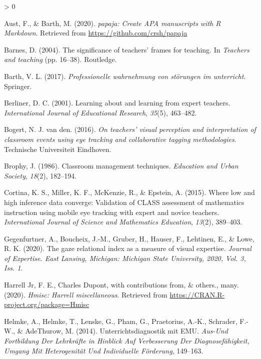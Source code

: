 \documentclass[
  english,
  man,floatsintext]{apa6}
\newlength{\cslhangindent}
\newenvironment{CSLReferences}[2] %
 {%
  \setlength{\parindent}{0pt}
  \ifodd #1 \everypar{\setlength{\hangindent}{\cslhangindent}}\ignorespaces\fi
  \ifnum #2 > 0
  \setlength{\parskip}{#2\baselineskip}
  \fi
 }%
 {}
\begin{document}
\hypertarget{refs}{}
\begin{CSLReferences}{1}{0}
\leavevmode\hypertarget{ref-R-papaja}{}%
Aust, F., \& Barth, M. (2020). \emph{{papaja}: {Create} {APA} manuscripts with {R Markdown}}. Retrieved from \url{https://github.com/crsh/papaja}

\leavevmode\hypertarget{ref-barnes2004significance}{}%
Barnes, D. (2004). The significance of teachers' frames for teaching. In \emph{Teachers and teaching} (pp. 16--38). Routledge.

\leavevmode\hypertarget{ref-barth2017professionelle}{}%
Barth, V. L. (2017). \emph{Professionelle wahrnehmung von störungen im unterricht}. Springer.

\leavevmode\hypertarget{ref-berliner2001learning}{}%
Berliner, D. C. (2001). Learning about and learning from expert teachers. \emph{International Journal of Educational Research}, \emph{35}(5), 463--482.

\leavevmode\hypertarget{ref-bogert2016visualperception}{}%
Bogert, N. J. van den. (2016). \emph{On teachers' visual perception and interpretation of classroom events using eye tracking and collaborative tagging methodologies}. Technische Universiteit Eindhoven.

\leavevmode\hypertarget{ref-brophy1986classroom}{}%
Brophy, J. (1986). Classroom management techniques. \emph{Education and Urban Society}, \emph{18}(2), 182--194.

\leavevmode\hypertarget{ref-cortina2015low}{}%
Cortina, K. S., Miller, K. F., McKenzie, R., \& Epstein, A. (2015). Where low and high inference data converge: Validation of CLASS assessment of mathematics instruction using mobile eye tracking with expert and novice teachers. \emph{International Journal of Science and Mathematics Education}, \emph{13}(2), 389--403.

\leavevmode\hypertarget{ref-gegenfurtner2020gaze}{}%
Gegenfurtner, A., Boucheix, J.-M., Gruber, H., Hauser, F., Lehtinen, E., \& Lowe, R. K. (2020). The gaze relational index as a measure of visual expertise. \emph{Journal of Expertise. East Lansing, Michigan: Michigan State University, 2020, Vol. 3, Iss. 1}.

\leavevmode\hypertarget{ref-R-Hmisc}{}%
Harrell Jr, F. E., Charles Dupont, with contributions from, \& others., many. (2020). \emph{Hmisc: Harrell miscellaneous}. Retrieved from \url{https://CRAN.R-project.org/package=Hmisc}

\leavevmode\hypertarget{ref-helmke2014unterrichtsdiagnostik}{}%
Helmke, A., Helmke, T., Lenske, G., Pham, G., Praetorius, A.-K., Schrader, F.-W., \& AdeThurow, M. (2014). Unterrichtsdiagnostik mit EMU. \emph{Aus-Und Fortbildung Der Lehrkr{ä}fte in Hinblick Auf Verbesserung Der Diagnosef{ä}higkeit, Umgang Mit Heterogenit{ä}t Und Individuelle F{ö}rderung}, 149--163.


\end{CSLReferences}
\end{document}
